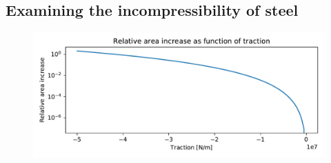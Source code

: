 \documentclass[sigconf]{acmart}
\begin{document}
\subsection{Examining the incompressibility of steel}
\begin{figure}
	\centering
	\includegraphics[width=\linewidth]{ex_loads.pdf}
\end{figure}
\end{document}
